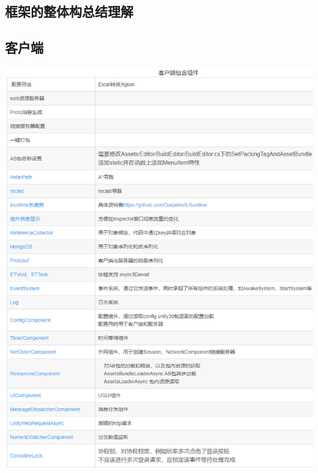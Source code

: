 \documentclass[9pt, b5paper]{article}
\begin{document}
\subsection{框架的整体构总结理解}
\label{sec-2-1}
\subsection{客户端}
\label{sec-2-2}

\includegraphics[width=.9\linewidth]{./pic/readme_20230131_220340.png}
\end{document}
